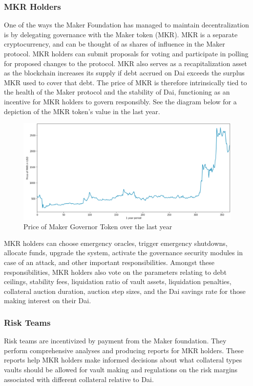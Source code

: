 \documentclass[bsc,frontabs,singlespacing,parskip,deptreport]{infthesis}
\begin{document}
    \subsubsection{MKR Holders}
    One of the ways  the Maker Foundation has managed to maintain decentralization is by delegating governance with the Maker token (MKR). MKR is a separate cryptocurrency, and can be thought of as shares of influence in the Maker protocol. MKR holders can submit proposals for voting and participate in polling for proposed changes to the protocol. MKR also serves as a recapitalization asset as the blockchain increases its supply if debt accrued on Dai exceeds the surplus MKR used to cover that debt. The price of MKR is therefore intrinsically tied to the health of the Maker protocol and the stability of Dai, functioning as an incentive for MKR holders to govern responsibly. See the diagram below for a depiction of the MKR token's value in the last year. 
    \begin{figure}[h]
            \centering
         \includegraphics[width=\linewidth]{Images and Figures/mkrprice.png}
              \caption{Price of Maker Governor Token over the last year}
    \end{figure}
    \smallbreak \noindent 
    MKR holders can choose emergency oracles, trigger emergency shutdowns, allocate funds, upgrade the system, activate the governance security modules in case of an attack, and other important responsibilities. Amongst these responsibilities, MKR holders also vote on the parameters relating to debt ceilings, stability fees, liquidation ratio of vault assets, liquidation penalties, collateral auction duration, auction step sizes, and the Dai savings rate for those making interest on their Dai. 
    \subsubsection{Risk Teams}
    Risk teams are incentivized by payment from the Maker foundation. They perform comprehensive analyses and producing reports for MKR holders. These reports help MKR holders make informed decisions about what collateral types vaults should be allowed for vault making and regulations on the risk margins associated with different collateral relative to Dai. 
\end{document}
